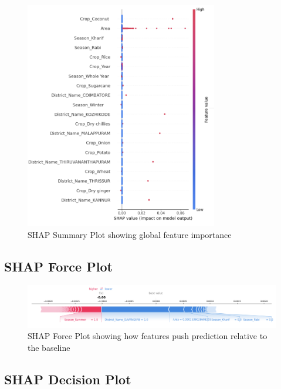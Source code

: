 \documentclass[a4paper,11pt,oneside]{book}
\begin{document}
\begin{figure}[h!]
    \centering
    \includegraphics[width=0.75\textwidth]{summary.png}
    \caption{SHAP Summary Plot showing global feature importance}
    \label{fig:shap-summary}
\end{figure}

\subsection{SHAP Force Plot}

\begin{figure}[h!]
    \centering
    \includegraphics[width=1.0\textwidth]{force.png}
    \caption{SHAP Force Plot showing how features push prediction relative to the baseline}
    \label{fig:shap-force}
\end{figure}

\subsection{SHAP Decision Plot}
\end{document}
